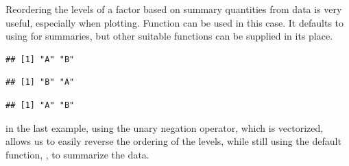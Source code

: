 \documentclass[krantz2]{krantz}\usepackage{knitr}%
\begin{document}
\begin{explainbox}
Reordering the levels of a factor based on summary quantities from data is very useful, especially when plotting. Function  can be used in this case. It defaults to using  for summaries, but other suitable functions can be supplied in its place.

\begin{knitrout}\footnotesize
{}\color{fgcolor}\begin{kframe}
\begin{alltt}
 \hlkwb{<-} \hlstd{(}\hlstd{,} \hlstd{,}  \hlstd{=} \hlstd{(}\hlstd{,} \hlstd{))}
 \hlkwb{<-} \hlstd{(}\hlstd{,} \hlstd{,} \hlstd{,} \hlstd{,} \hlstd{,} \hlstd{,} \hlstd{,} \hlstd{,} \hlstd{,} \hlstd{)}
\end{alltt}
\begin{verbatim}
## [1] "A" "B"
\end{verbatim}
\begin{alltt}
 \hlkwb{<-} 
\end{alltt}
\begin{verbatim}
## [1] "B" "A"
\end{verbatim}
\begin{alltt}
 \hlkwb{<-}  \hlopt{-} 
\end{alltt}
\begin{verbatim}
## [1] "A" "B"
\end{verbatim}
\end{kframe}
\end{knitrout}

in the last example, using the unary negation operator, which is vectorized, allows us to easily reverse the ordering of the levels, while still using the default function, , to summarize the data.

\end{explainbox}
\end{document}
